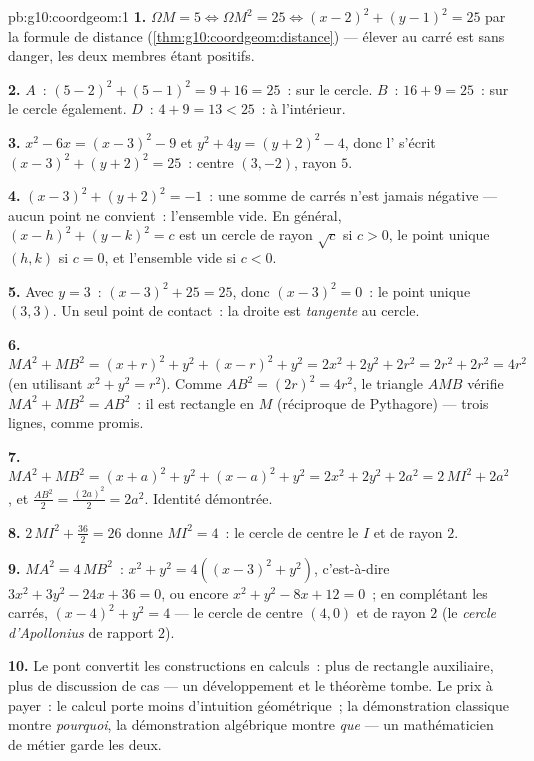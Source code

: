 \begin{solution}{pb:g10:coordgeom:1}
\textbf{1.} $\Omega M = 5 \iff \Omega M^2 = 25 \iff
(x - 2)^2 + (y - 1)^2 = 25$ par la formule de distance
(\cref{thm:g10:coordgeom:distance}) --- élever au carré est sans
danger, les deux membres étant positifs.

\textbf{2.} $A$~: $(5-2)^2 + (5-1)^2 = 9 + 16 = 25$~: sur le cercle.
$B$~: $16 + 9 = 25$~: sur le cercle également. $D$~:
$4 + 9 = 13 < 25$~: à l'intérieur.

\textbf{3.} $x^2 - 6x = (x - 3)^2 - 9$ et $y^2 + 4y = (y + 2)^2 - 4$,
donc l' s'écrit $(x - 3)^2 + (y + 2)^2 = 25$~: centre
$(3, -2)$, rayon $5$.

\textbf{4.} $(x - 3)^2 + (y + 2)^2 = -1$~: une somme de carrés n'est
jamais négative --- aucun point ne convient~: l'ensemble vide. En
général, $(x - h)^2 + (y - k)^2 = c$ est un cercle de rayon $\sqrt c$
si $c > 0$, le point unique $(h, k)$ si $c = 0$, et l'ensemble vide
si $c < 0$.

\textbf{5.} Avec $y = 3$~: $(x - 3)^2 + 25 = 25$, donc
$(x - 3)^2 = 0$~: le point unique $(3, 3)$. Un seul point de
contact~: la droite est \emph{tangente} au cercle.

\textbf{6.} $MA^2 + MB^2 = (x + r)^2 + y^2 + (x - r)^2 + y^2
= 2x^2 + 2y^2 + 2r^2 = 2r^2 + 2r^2 = 4r^2$ (en utilisant
$x^2 + y^2 = r^2$). Comme $AB^2 = (2r)^2 = 4r^2$, le triangle $AMB$
vérifie $MA^2 + MB^2 = AB^2$~: il est rectangle en $M$ (réciproque de
Pythagore) --- trois lignes, comme promis.

\textbf{7.} $MA^2 + MB^2 = (x + a)^2 + y^2 + (x - a)^2 + y^2
= 2x^2 + 2y^2 + 2a^2 = 2\,MI^2 + 2a^2$, et
$\frac{AB^2}{2} = \frac{(2a)^2}{2} = 2a^2$. Identité démontrée.

\textbf{8.} $2\,MI^2 + \frac{36}{2} = 26$ donne $MI^2 = 4$~: le
cercle de centre le  $I$ et de rayon $2$.

\textbf{9.} $MA^2 = 4\,MB^2$~:
$x^2 + y^2 = 4\left((x - 3)^2 + y^2\right)$, c'est-à-dire
$3x^2 + 3y^2 - 24x + 36 = 0$, ou encore
$x^2 + y^2 - 8x + 12 = 0$~; en complétant les carrés,
$(x - 4)^2 + y^2 = 4$ --- le cercle de centre $(4, 0)$ et de rayon
$2$ (le \emph{cercle d'Apollonius} de rapport $2$).

\textbf{10.} Le pont convertit les constructions en calculs~: plus de
rectangle auxiliaire, plus de discussion de cas --- un
développement et le théorème tombe. Le prix à payer~: le calcul porte
moins d'intuition géométrique~; la démonstration classique montre
\emph{pourquoi}, la démonstration algébrique montre \emph{que} --- un
mathématicien de métier garde les deux.


\end{solution}

